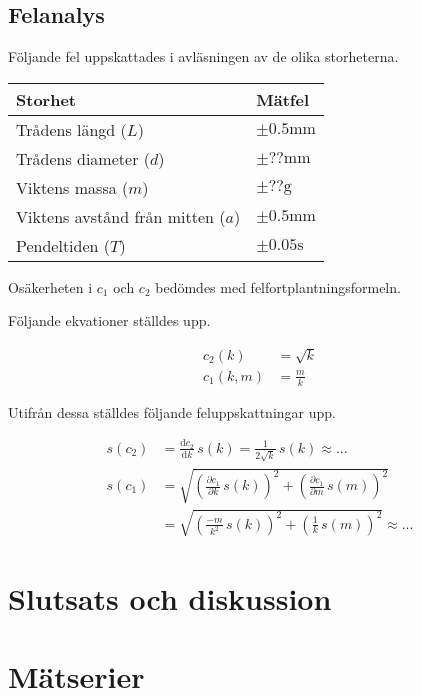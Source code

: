\documentclass[a4paper,12pt]{article}
\newcommand*{\dd}{\mathrm{d}}
\begin{document}
\subsection{Felanalys}

Följande fel uppskattades i avläsningen av de olika storheterna.

\begin{tabular}{|l|l|}
  \hline
  \textbf{Storhet} & \textbf{Mätfel} \\\hline
  Trådens längd ($L$) & $\pm 0.5 \text{mm}$ \\\hline
  Trådens diameter ($d$) & $\pm ?? \text{mm}$ \\\hline
  Viktens massa ($m$) & $\pm ?? \text{g}$ \\\hline
  Viktens avstånd från mitten ($a$) & $\pm 0.5 \text{mm}$ \\\hline
  Pendeltiden ($T$) & $\pm 0.05 \text{s}$ \\\hline
\end{tabular}

Osäkerheten i $c_1$ och $c_2$ bedömdes med felfortplantningsformeln.

Följande ekvationer ställdes upp.

\begin{align}
  c_2(k) &= \sqrt{k} \\
  c_1(k, m) &= \frac{m}{k}
\end{align} 

Utifrån dessa ställdes följande feluppskattningar upp.

\begin{align}
  s(c_2) &= \frac{\dd c_2}{\dd k} \, s(k) = \frac{1}{2\sqrt{k}} \, s(k) \approx ...\\
  s(c_1) &= \sqrt{\left( \frac{\partial c_1}{\partial k} \, s(k) \right)^2 + \left( \frac{\partial c_1}{\partial m} \, s(m) \right)^2} \nonumber \\
         &= \sqrt{\left( \frac{-m}{k^2} \, s(k) \right)^2 + \left( \frac{1}{k} \, s(m) \right)^2} \approx ...
\end{align}

\section{Slutsats och diskussion}
\lipsum[1-2]

\clearpage
\appendix
\section{Mätserier}
\end{document}
